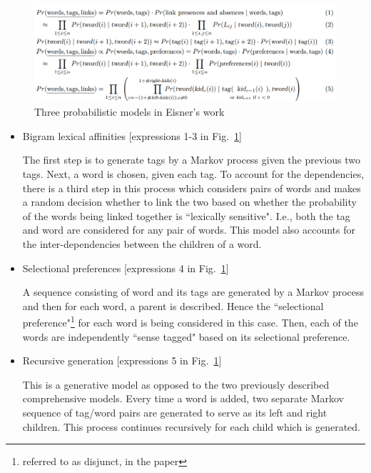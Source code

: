 \begin{figure}[!htb]
    \centering
    \includegraphics[scale = 0.45]{figures/Eisner.png}
    \centering
    \caption{Three probabilistic models in Eisner's work}
    \label{fig:eisnerexpressions}
\end{figure}

\begin{itemize}

\item Bigram lexical affinities [expressions 1-3 in Fig.~\ref{fig:eisnerexpressions}]

The first step is to generate tags by a Markov process given the previous two tags. Next, a word is chosen, given each tag. To account for the dependencies, there is a third step in this process which considers pairs of words and makes a random decision whether to link the two based on whether the probability of the words being linked together is ``lexically sensitive". I.e., both the tag and word are considered for any pair of words. This model also accounts for the inter-dependencies between the children of a word.

\item Selectional preferences [expressions 4 in Fig.~\ref{fig:eisnerexpressions}]

A sequence consisting of word and its tags are generated by a Markov process and then for each word, a parent is described. Hence the ``selectional preference"\footnote{referred to as disjunct, in the paper} for each word is being considered in this case. Then, each of the words are independently ``sense tagged" based on its selectional preference.

\item Recursive generation [expressions 5 in Fig.~\ref{fig:eisnerexpressions}]

This is a generative model as opposed to the two previously described comprehensive models. Every time a word is added, two separate Markov sequence of tag/word pairs are generated to serve as its left and right children. This process continues recursively for each child which is generated.

\end{itemize}

